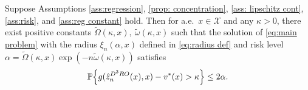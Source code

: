 \documentclass[onefignum,onetabnum]{siamart251216}
\begin{document}
    \begin{proposition}\label{prop:oos-guarantee}
	Suppose Assumptions \ref{ass:regression}, \ref{prop: concentration}, \ref{ass: lipschitz cont}, \ref{ass:risk}, and \ref{ass:reg constant} hold. Then for a.e.\ $x \in \mathcal{X}$ and any $\kappa >0$, there exist positive constants $\tilde{\Omega}(\kappa,x), \ \tilde{\omega}(\kappa,x)$ such that the solution of \eqref{eq:main problem} with the radius $\xi_n(\alpha,x)$ defined in \eqref{eq:radius def} and risk level $\alpha =\tilde{\Omega}(\kappa,x)\exp(-n\tilde{\omega}(\kappa,x))$ satisfies 
\begin{align}
\mathbb{P}\Bigl\{g(\hat{z}_n^{D^3RO}(x), x) - v^*(x) > \kappa \Bigr\} \leq 2\alpha.\label{eq:finite-sample-solution}
\end{align}
\end{proposition}
\end{document}
